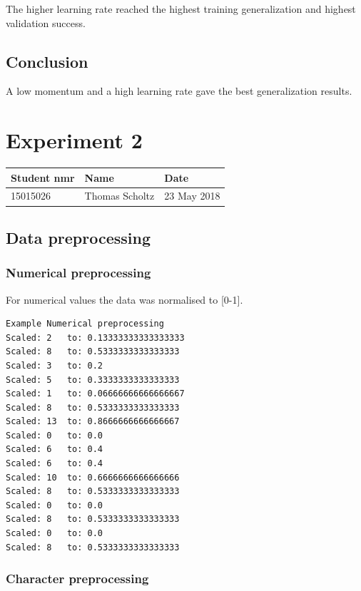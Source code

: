 \documentclass[11pt]{article}
\begin{document}
The higher learning rate reached the highest training generalization and
highest validation success.

\hypertarget{conclusion}{%
\subsection{Conclusion}\label{conclusion}}

A low momentum and a high learning rate gave the best generalization
results.

    \hypertarget{experiment-2}{%
\section{Experiment 2}\label{experiment-2}}

\begin{longtable}[]{@{}lll@{}}
\toprule
Student nmr & Name & Date\tabularnewline
\midrule
\endhead
15015026 & Thomas Scholtz & 23 May 2018\tabularnewline
\bottomrule
\end{longtable}

    \hypertarget{data-preprocessing}{%
\subsection{Data preprocessing}\label{data-preprocessing}}

\hypertarget{numerical-preprocessing}{%
\subsubsection{Numerical preprocessing}\label{numerical-preprocessing}}

For numerical values the data was normalised to {[}0-1{]}.

\begin{verbatim}
Example Numerical preprocessing
Scaled: 2   to: 0.13333333333333333
Scaled: 8   to: 0.5333333333333333
Scaled: 3   to: 0.2
Scaled: 5   to: 0.3333333333333333
Scaled: 1   to: 0.06666666666666667
Scaled: 8   to: 0.5333333333333333
Scaled: 13  to: 0.8666666666666667
Scaled: 0   to: 0.0
Scaled: 6   to: 0.4
Scaled: 6   to: 0.4
Scaled: 10  to: 0.6666666666666666
Scaled: 8   to: 0.5333333333333333
Scaled: 0   to: 0.0
Scaled: 8   to: 0.5333333333333333
Scaled: 0   to: 0.0
Scaled: 8   to: 0.5333333333333333
\end{verbatim}

\hypertarget{character-preprocessing}{%
\subsubsection{Character preprocessing}\label{character-preprocessing}}
\end{document}
